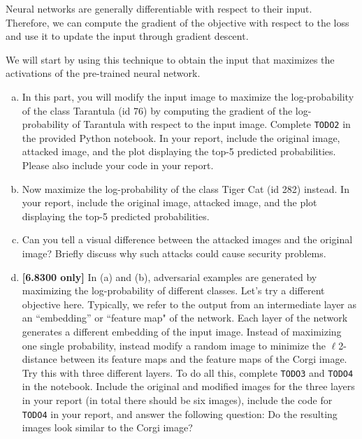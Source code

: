 \documentclass[11pt]{article}
\begin{document}
Neural networks are generally differentiable with respect to their input.  Therefore,  we can compute the gradient of the objective with respect to the loss and use it to update the input through gradient descent.

We will start by using this technique to obtain the input that maximizes the activations of the pre-trained neural network.

\begin{enumerate}[(a)]
\item\label{Tarantula} In this part, you will modify the input image to maximize the log-probability of the class Tarantula (id 76) by computing the gradient of the log-probability of Tarantula with respect to the input image.  Complete \texttt{TODO2} in the provided Python notebook. In your report, include the original image, attacked image, and the plot displaying the top-5 predicted probabilities. Please also include your code in your report.

\item\label{Tigercat} Now maximize the log-probability of the class Tiger Cat (id 282) instead. In your report, include the original image, attacked image, and the plot displaying the top-5 predicted probabilities.

\item Can you tell a visual difference between the attacked images and the original image? Briefly discuss why such attacks could cause security problems.

\item \textbf{[6.8300 only]} In (a) and (b), adversarial examples are generated by maximizing the log-probability of different classes. Let's try a different objective here. Typically, we refer to the output from an intermediate layer as an ``embedding'' or ``feature map" of the network. Each layer of the network generates a different embedding of the input image. Instead of maximizing one single probability, instead modify a random image to minimize the $\ell$2-distance between its feature maps and the feature maps of the Corgi image. Try this with three different layers. To do all this, complete \texttt{TODO3} and \texttt{TODO4} in the notebook. Include the original and modified images for the three layers in your report (in total there should be six images), include the code for \texttt{TODO4} in your report, and answer the following question: Do the resulting images look similar to the Corgi image? 


\end{enumerate}
\end{document}
